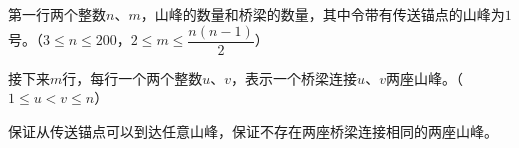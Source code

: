 第一行两个整数$n$、$m$，山峰的数量和桥梁的数量，其中令带有传送锚点的山峰为$1$号。（$3 \le n \le 200$，$2 \le m \le \dfrac{n(n - 1)}{2}$）

接下来$m$行，每行一个两个整数$u$、$v$，表示一个桥梁连接$u$、$v$两座山峰。（$1 \le u < v \le n$）

保证从传送锚点可以到达任意山峰，保证不存在两座桥梁连接相同的两座山峰。